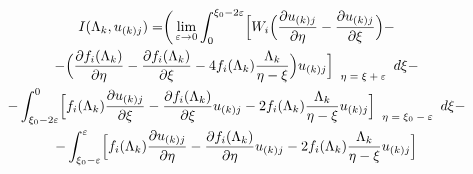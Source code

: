 \begin{multline}

\label{I_lambda}

 I(\Lambda_k,u_{(k)j}) = \biggr( 

 \lim\limits_{\varepsilon \to 0}  \int _0^{\xi_0-2 \varepsilon}

 \Bigl[W_i \Bigl(

\frac{\partial u_{(k)j}}{\partial \eta}-\frac{\partial u_{(k)j}}{\partial \xi}\Bigr) - \\

-

\Bigl(\frac{\partial f_i(\Lambda_k)}{\partial \eta}-\frac{\partial f_i(\Lambda_k)}{\partial \xi} - 4 f_i(\Lambda_k) \frac{\Lambda_k}{\eta-\xi}\Bigr)u_{(k)j}

\Bigr]

_{\scriptsize{

\begin{array}{l}

\eta=\xi+\varepsilon

 \end{array} }}

 d \xi -

\\

-

 \int _{\xi_0-2 \varepsilon}^{0}

 \Bigl[

f_i(\Lambda_k) \frac{\partial u_{(k)j}}{\partial \xi} - \frac{\partial f_i(\Lambda_k)}{\partial \xi} u_{(k)j} - 2 f_i(\Lambda_k) \frac{\Lambda_k}{\eta-\xi} u_{(k)j}

\Bigr]

_{\scriptsize{

\begin{array}{l}

\eta=\xi_0-\varepsilon

 \end{array} }}

  d \xi -

\\-

 \int _{\xi_0- \varepsilon}^{\varepsilon}

 \Bigl[

f_i(\Lambda_k) \frac{\partial u_{(k)j}}{\partial \eta} - \frac{\partial f_i(\Lambda_k)}{\partial \eta} u_{(k)j} - 2 f_i(\Lambda_k) \frac{\Lambda_k}{\eta-\xi} u_{(k)j}

\Bigr]

_{\scriptsize{

}}
\end{multline}
